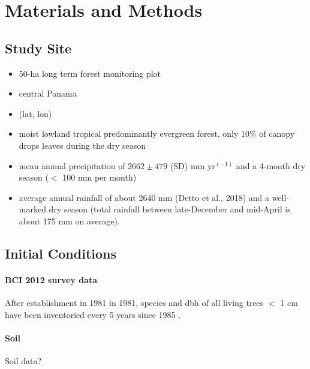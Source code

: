 \section*{Materials and Methods}

{}
\subsection*{Study Site}

\begin{itemize}
    \item 50-ha long term forest monitoring plot
    \item central Panama
    \item (lat, lon)
    \item moist lowland tropical predominantly evergreen forest, only 10\% of canopy drops leaves during the dry season %
    \item mean annual precipitation of $2662 \pm 479$ (SD) mm yr$^{(-1)}$ and a 4-month dry season ($<$ 100 mm per month)  
    \item average annual rainfall of about 2640 mm (Detto et al.,
2018) and a well-marked dry season (total rainfall between late-December and mid-April is about 175 mm on average). 
\end{itemize}
{}
\subsection*{Initial Conditions}

\paragraph{BCI 2012 survey data}
After establishment in 1981 in 1981, species and dbh of all living trees $<$ 1 cm have been inventoried every 5 years since 1985 \citep{condit_1995}. 

\paragraph{Soil} 
Soil data?

